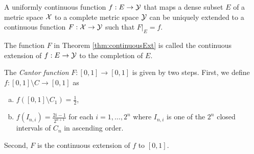 \begin{thm}
  \label{thm:continuousExt}
  A uniformly continuous function $f: E \rightarrow {\cal Y}$ 
  that maps a dense subset $E$ of a metric space ${\cal X}$
  to a complete metric space ${\cal Y}$
  can be uniquely extended to a continuous function
  $F: {\cal X}\rightarrow {\cal Y}$ such that
  $F|_{E} = f$.
\end{thm}

\begin{defn}
  \label{def:continuousExt}
  The function $F$ in Theorem \ref{thm:continuousExt}
  is called the continuous extension of $f:E\rightarrow {\cal Y}$
  to the completion of $E$.
\end{defn}

\begin{defn}
  \label{def:CantorFunction}
  The \emph{Cantor function} $F:[0,1]\rightarrow[0,1]$
  is given by two steps.
  First, we define $f:[0,1]\setminus C \rightarrow[0,1]$
  as
  \begin{enumerate}[(a)]\itemsep0em
  \item %
    $f([0,1]\setminus C_1)=\frac{1}{2}$,
  \item $f(I_{n,i})=\frac{2i-1}{2^{n+1}}$
    for each $i=1,\ldots,2^n$
    where $I_{n,i}$ is one of the $2^{n}$ closed intervals
    of $C_n$ in ascending order.
  \end{enumerate}
  Second, $F$ is the continuous extension of $f$
  to $[0,1]$. 
\end{defn}

